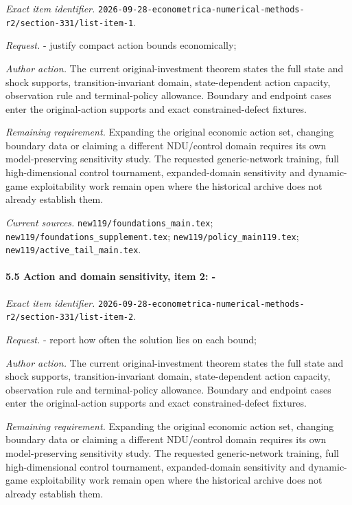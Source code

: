 \emph{Exact item identifier.} \nolinkurl{2026-09-28-econometrica-numerical-methods-r2/section-331/list-item-1}.

\par\emph{Request.} - justify compact action bounds economically;

\par\emph{Author action.} The current original-investment theorem states the full state and shock supports, transition-invariant domain, state-dependent action capacity, observation rule and terminal-policy allowance. Boundary and endpoint cases enter the original-action supports and exact constrained-defect fixtures.

\par\emph{Remaining requirement.} Expanding the original economic action set, changing boundary data or claiming a different NDU/\allowbreak{}control domain requires its own model-preserving sensitivity study. The requested generic-network training, full high-dimensional control tournament, expanded-domain sensitivity and dynamic-game exploitability work remain open where the historical archive does not already establish them.

\par\emph{Current sources.} \nolinkurl{new119/foundations_main.tex}; \nolinkurl{new119/foundations_supplement.tex}; \nolinkurl{new119/policy_main119.tex}; \nolinkurl{new119/active_tail_main.tex}.

\paragraph{5.5 Action and domain sensitivity, item 2: -}

\emph{Exact item identifier.} \nolinkurl{2026-09-28-econometrica-numerical-methods-r2/section-331/list-item-2}.

\par\emph{Request.} - report how often the solution lies on each bound;

\par\emph{Author action.} The current original-investment theorem states the full state and shock supports, transition-invariant domain, state-dependent action capacity, observation rule and terminal-policy allowance. Boundary and endpoint cases enter the original-action supports and exact constrained-defect fixtures.

\par\emph{Remaining requirement.} Expanding the original economic action set, changing boundary data or claiming a different NDU/\allowbreak{}control domain requires its own model-preserving sensitivity study. The requested generic-network training, full high-dimensional control tournament, expanded-domain sensitivity and dynamic-game exploitability work remain open where the historical archive does not already establish them.

